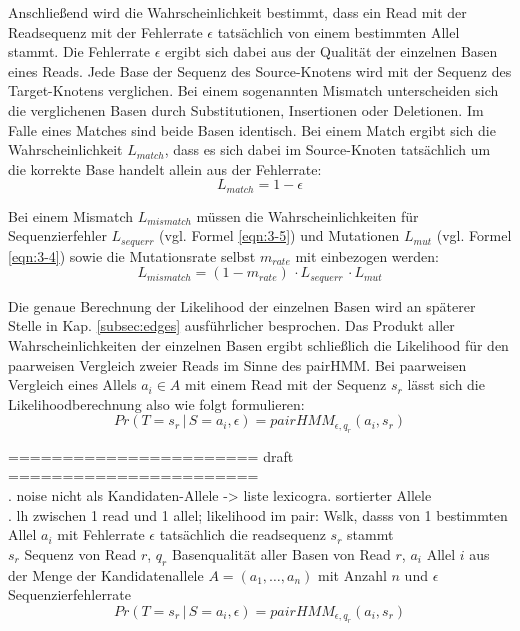 Anschließend wird die Wahrscheinlichkeit bestimmt, dass ein Read mit der Readsequenz mit der Fehlerrate $\epsilon$ tatsächlich von einem bestimmten Allel stammt. Die Fehlerrate $\epsilon$ ergibt sich dabei aus der Qualität der einzelnen Basen eines Reads. Jede Base der Sequenz des Source-Knotens wird mit der Sequenz des Target-Knotens verglichen. Bei einem sogenannten Mismatch unterscheiden sich die verglichenen Basen durch Substitutionen, Insertionen oder Deletionen. Im Falle eines Matches sind beide Basen identisch. Bei einem Match ergibt sich die Wahrscheinlichkeit $L_{match}$, dass es sich dabei im Source-Knoten tatsächlich um die korrekte Base handelt allein aus der Fehlerrate:
\begin{equation} \label{eqn:2-1}
\tag{2-1}
L_{match} = 1 - \epsilon
\end{equation}

Bei einem Mismatch $L_{mismatch}$ müssen die Wahrscheinlichkeiten für Sequenzierfehler $L_{sequerr}$ (vgl. Formel \eqref{eqn:3-5}) und Mutationen $L_{mut}$ (vgl. Formel \eqref{eqn:3-4}) sowie die Mutationsrate selbst $m_{rate}$ mit einbezogen werden: 
\begin{equation} \label{eqn:2-2}
\tag{2-2}
L_{mismatch} = (1 - m_{rate}) \, \cdotp L_{sequerr} \, \cdotp L_{mut}
\end{equation}

Die genaue Berechnung der Likelihood der einzelnen Basen wird an späterer Stelle in Kap. \ref{subsec:edges} ausführlicher besprochen. Das Produkt aller Wahrscheinlichkeiten der einzelnen Basen ergibt schließlich die Likelihood für den paarweisen Vergleich zweier Reads im Sinne des pairHMM. Bei paarweisen Vergleich eines Allels $a_{i} \in A $ mit einem Read mit der Sequenz $s_{r}$ lässt sich die Likelihoodberechnung also wie folgt formulieren:
\begin{equation} \label{eqn:2-3}
\tag{2-3}
Pr(T=s_{r} \, | \, S=a_{i}, \epsilon) = pairHMM_{\epsilon,q_{r}}(a_{i}, s_{r})
\end{equation}


\noindent======================= draft =======================\\

. noise nicht als Kandidaten-Allele -> liste lexicogra. sortierter Allele\\

. lh zwischen 1 read und 1 allel; likelihood im pair: Wslk, dasss von 1 bestimmten Allel $a_{i}$ mit Fehlerrate $\epsilon$ tatsächlich die readsequenz $s_{r}$ stammt \\
$s_{r}$ Sequenz von Read $r$, $q_{r}$ Basenqualität aller Basen von Read $r$, $a_{i}$ Allel $i$ aus der Menge der Kandidatenallele $A=(a_{1},\dots, a_{n})$ mit Anzahl $n$ und $\epsilon$ Sequenzierfehlerrate
\begin{equation} \label{eqn:2-xxx1}
\tag{2-xxx1}
Pr(T=s_{r} \, | \, S=a_{i}, \epsilon) = pairHMM_{\epsilon,q_{r}}(a_{i}, s_{r})
\end{equation}

